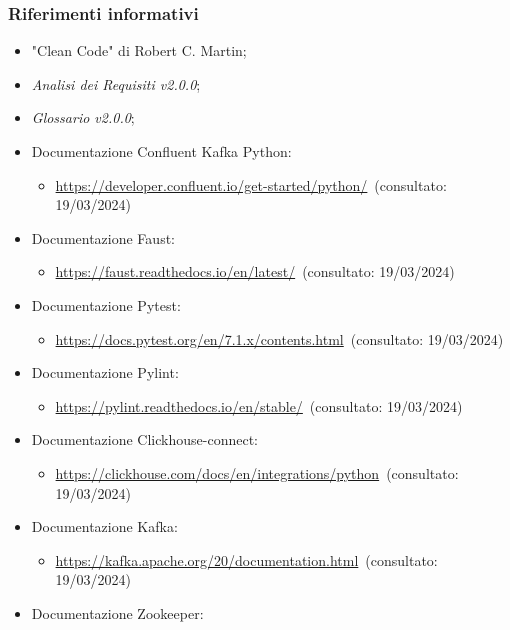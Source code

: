 \subsubsection{Riferimenti informativi}
\begin{itemize}
    \item "Clean Code" di Robert C. Martin;
    \item \textit{Analisi dei Requisiti v2.0.0};
    \item \textit{Glossario v2.0.0};
    \item Documentazione Confluent Kafka Python:
    \begin{itemize}
        \item \url{https://developer.confluent.io/get-started/python/}~(consultato: 19/03/2024)
    \end{itemize}
    \item Documentazione Faust: 
    \begin{itemize}
        \item \url{https://faust.readthedocs.io/en/latest/}~(consultato: 19/03/2024)
    \end{itemize}
    \item Documentazione Pytest: 
    \begin{itemize}
        \item \url{https://docs.pytest.org/en/7.1.x/contents.html}~(consultato: 19/03/2024)
    \end{itemize}
    \item Documentazione Pylint: 
    \begin{itemize}
        \item \url{https://pylint.readthedocs.io/en/stable/}~(consultato: 19/03/2024)
    \end{itemize}
    \item Documentazione Clickhouse-connect: 
    \begin{itemize}
        \item \url{https://clickhouse.com/docs/en/integrations/python}~(consultato: 19/03/2024)
    \end{itemize}
    \item Documentazione Kafka: 
    \begin{itemize}
        \item \url{https://kafka.apache.org/20/documentation.html}~(consultato: 19/03/2024)
    \end{itemize}
    \item Documentazione Zookeeper: 
    \begin{itemize}

\end{itemize}
\end{itemize}
